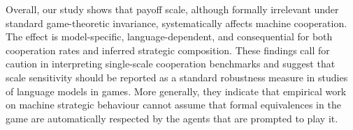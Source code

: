 \documentclass[11pt,a4paper]{article}
\begin{document}

Overall, our study shows that payoff scale, although formally irrelevant under standard game-theoretic invariance, systematically affects machine cooperation. The effect is model-specific, language-dependent, and consequential for both cooperation rates and inferred strategic composition. These findings call for caution in interpreting single-scale cooperation benchmarks and suggest that scale sensitivity should be reported as a standard robustness measure in studies of language models in games. More generally, they indicate that empirical work on machine strategic behaviour cannot assume that formal equivalences in the game are automatically respected by the agents that are prompted to play it.





\end{document}
